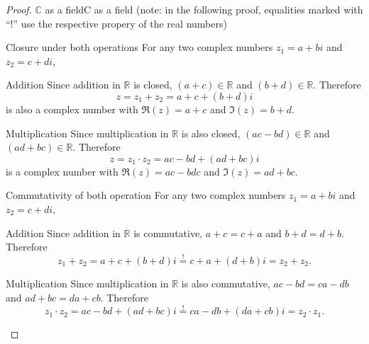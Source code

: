 \begin{proof}{$\bm{\mathbb{C}}$ as a field}{C as a field}
	(note: in the following proof, equalities marked with ``$!$'' use the respective propery of the real numbers)

	\begin{descitemize}
		\item[Closure under both operations] For any two complex numbers $z_{1}=a+bi$ and $z_{2}=c+di$,
			\begin{listitemize}
			\item[Addition] Since addition in $\mathbb{R}$ is closed, $(a+c)\in\mathbb{R}$ and $(b+d)\in\mathbb{R}$. Therefore
				\[
					z = z_{1}+z_{2} = a+c + (b+d)i
				\]
				is also a complex number with $\Re(z)=a+c$ and $\Im(z)=b+d$.
			\item[Multiplication] Since multiplication in $\mathbb{R}$ is also closed, $(ac-bd)\in\mathbb{R}$ and $(ad+bc)\in\mathbb{R}$. Therefore
				\[
					z = z_{1} \cdot z_{2} = ac-bd + (ad+bc)i
				\]
				is a complex number with $\Re(z)=ac-bdc$ and $\Im(z)=ad+bc$.
			\end{listitemize}
		
		\item[Commutativity of both operation] For any two complex numbers $z_{1}=a+bi$ and $z_{2}=c+di$,
			\begin{listitemize}
			\item[Addition] Since addition in $\mathbb{R}$ is commutative, $a+c=c+a$ and $b+d=d+b$. Therefore
				\[
					z_{1} + z_{2} = a+c + (b+d)i \overset{!}{=} c+a + (d+b)i = z_{2}+z_{2}.
				\]
			\item[Multiplication] Since multiplication in $\mathbb{R}$ is also commutative, $ac-bd = ca-db$ and $ad+bc=da+cb$. Therefore
				\[
					z_{1} \cdot z_{2} = ac-bd + (ad+bc)i \overset{!}{=} ca-db + (da+cb)i = z_{2} \cdot z_{1}.
				\]
			\end{listitemize}
		

\end{descitemize}
\end{proof}
